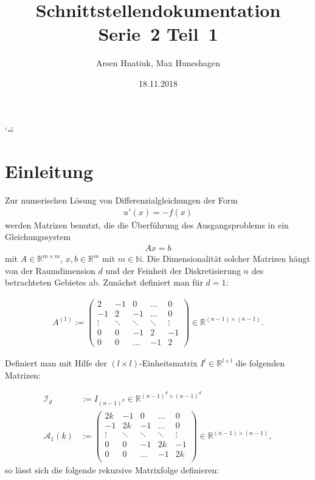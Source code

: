 \documentclass[a4paper,10pt,ngerman, openright]{sphinxmanual}
\title{Schnittstellendokumentation Serie~2 Teil~1}
\date{18.11.2018}
\author{Arsen Hnatiuk, Max Huneshagen}
\begin{document}
\let\cleardoublepage\clearpage
\ifnum\catcode`\"=\active{}\fi
\maketitle
\sphinxtableofcontents
{}\label{\detokenize{index::doc}}


\chapter{Einleitung}

Zur numerischen Lösung von Differenzialgleichungen der Form 
\begin{align}
u'(x)=-f(x)
\label{eq:dgl}
\end{align}
werden Matrizen benutzt, die die Überführung des Ausgangsproblems in ein Gleichungssystem
\begin{align}
Ax=b	
\label{eq:lgs}
\end{align}
mit $A\in\mathbb{R}^{m\times m}$, $x,b\in \mathbb{R}^m$ mit $m\in\mathbb{N}$. Die Dimensionalität solcher Matrizen hängt von der Raumdimension $d$ und der Feinheit der Diskretisierung $n$ des betrachteten Gebietes ab. Zunächst definiert man für $d=1$:

\begin{align}
A^{(1)}:= 
\begin{pmatrix}
2 & -1 & 0 & \dots & 0\\
-1 & 2 & -1 & \dots & 0\\
\vdots & \ddots & \ddots & \ddots & \vdots\\
0 & 0 & -1 & 2 & -1\\
0 & 0 & \dots & -1 & 2
\end{pmatrix}\in \mathbb{R}^{(n-1)\times(n-1)}.
\label{eq:a_1_def}
\end{align}

Definiert man mit Hilfe der $(l\times l)$-Einheitsmatrix $I^l\in \mathbb{R}^{l\times l}$ die folgenden Matrizen:

\begin{align}
\mathcal{I}_d&:=I_{(n-1)^d}\in\mathbb{R}^{(n-1)^d\times(n-1)^d}\\
\mathcal{A}_1(k)&:=
\begin{pmatrix}
2k & -1 & 0 & \dots & 0\\
-1 & 2k & -1 & \dots & 0\\
\vdots & \ddots & \ddots & \ddots & \vdots \\
0 & 0 & -1 & 2k & -1\\
0 & 0 & \dots & -1 & 2k\\
\end{pmatrix} \in \mathbb{R}^{(n-1)\times(n-1)},
\end{align}
so lässt sich die folgende rekursive Matrixfolge definieren:
\end{document}
